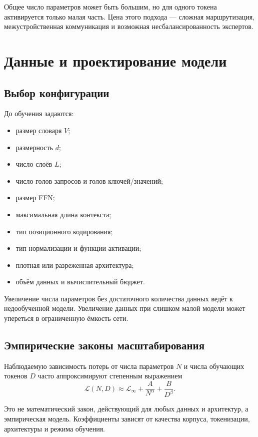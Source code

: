 \documentclass[12pt,a4paper]{article}
\newcommand{\1}{\mathbf{1}}
\theoremstyle{definition}
\theoremstyle{remark}
\begin{document}
Общее число параметров может быть большим, но для одного токена
активируется только малая часть. Цена этого подхода --- сложная
маршрутизация, межустройственная коммуникация и возможная
несбалансированность экспертов.

\section{Данные и проектирование модели}

\subsection{Выбор конфигурации}

До обучения задаются:

\begin{itemize}
    \item размер словаря $V$;
    \item размерность $d$;
    \item число слоёв $L$;
    \item число голов запросов и голов ключей/значений;
    \item размер FFN;
    \item максимальная длина контекста;
    \item тип позиционного кодирования;
    \item тип нормализации и функции активации;
    \item плотная или разреженная архитектура;
    \item объём данных и вычислительный бюджет.
\end{itemize}

Увеличение числа параметров без достаточного количества данных ведёт к
недообученной модели. Увеличение данных при слишком малой модели может
упереться в ограниченную ёмкость сети.

\subsection{Эмпирические законы масштабирования}

Наблюдаемую зависимость потерь от числа параметров $N$ и числа обучающих
токенов $D$ часто аппроксимируют степенным выражением
\[
\mathcal{L}(N,D)
\approx
\mathcal{L}_{\infty}
+
\frac{A}{N^\alpha}
+
\frac{B}{D^\beta}.
\]

Это не математический закон, действующий для любых данных и архитектур,
а эмпирическая модель. Коэффициенты зависят от качества корпуса,
токенизации, архитектуры и режима обучения.
\end{document}
